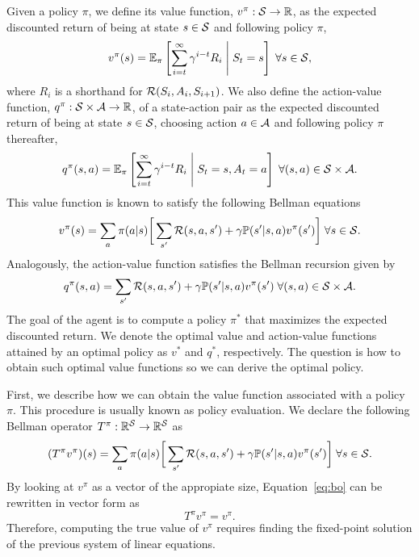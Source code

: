 Given a policy $\pi$, we define its value function, $v^\pi:\mathcal{S}\rightarrow\mathbb{R}$, as the expected discounted return of being at state $s\in\mathcal{S}$ and following policy $\pi$,
\begin{equation}
  v^\pi(s) = \mathbb{E}_{\pi}\left[\sum_{i=t} ^\infty \gamma ^ {i-t} R_i\;\middle\lvert\;S_t = s\right]\;\forall s\in\mathcal{S}, 
\end{equation}
where $R_i$ is a shorthand for $\mathcal{R}(S_i, A_i, S_{i+1})$. We also define the action-value function, $q^\pi:\mathcal{S}\times\mathcal{A}\rightarrow\mathbb{R}$, of a state-action pair as the expected discounted return of being at state $s\in\mathcal{S}$, choosing action $a\in\mathcal{A}$ and following policy $\pi$ thereafter,
\begin{equation}
  q^\pi(s, a) = \mathbb{E}_{\pi}\left[\sum_{i=t} ^\infty \gamma ^ {i-t} R_i\;\middle\lvert\;S_t = s, A_t = a\right]\;\forall (s, a)\in\mathcal{S}\times\mathcal{A}.
\end{equation}
This value function is known to satisfy the following Bellman equations
\begin{equation}
  v^\pi(s) = \sum_a \pi(a\lvert s)\bigg[\sum_{s'} \mathcal{R}(s, a, s') + \gamma \mathbb{P}(s'\lvert s, a)v^\pi(s')\bigg]\;\forall s\in\mathcal{S}.
\end{equation}
Analogously, the action-value function satisfies the Bellman recursion given by 
\begin{equation}
  q^\pi(s, a) = \sum_{s'} \mathcal{R}(s, a, s') + \gamma \mathbb{P}(s'\lvert s, a)v^\pi(s')\;\forall (s, a)\in\mathcal{S}\times\mathcal{A}.
\end{equation}
The goal of the agent is to compute a policy $\pi^*$ that maximizes the expected discounted return. We denote the optimal value and action-value functions attained by an optimal policy as $v^*$ and $q^*$, respectively. The question is how to obtain such optimal value functions so we can derive the optimal policy.

First, we describe how we can obtain the value function associated with a policy $\pi$. This procedure is usually known as policy evaluation. We declare the following Bellman operator $T^\pi:\mathbb{R}^{\mathcal{S}}\rightarrow\mathbb{R}^{\mathcal{S}}$ as 
\begin{equation}
  (T^\pi v^\pi)(s) = \sum_a \pi(a\lvert s)\bigg[\sum_{s'} \mathcal{R}(s, a, s') + \gamma \mathbb{P}(s'\lvert s, a)v^\pi(s')\bigg]\;\forall s\in\mathcal{S}.
  \label{eq:bo}
\end{equation}
By looking at $v^\pi$ as a vector of the appropiate size, Equation~\ref{eq:bo} can be rewritten in vector form as 
\begin{equation}
  T^\pi v^\pi = v^\pi.
\end{equation}
Therefore, computing the true value of $v^\pi$ requires finding the fixed-point solution of the previous system of linear equations. 

